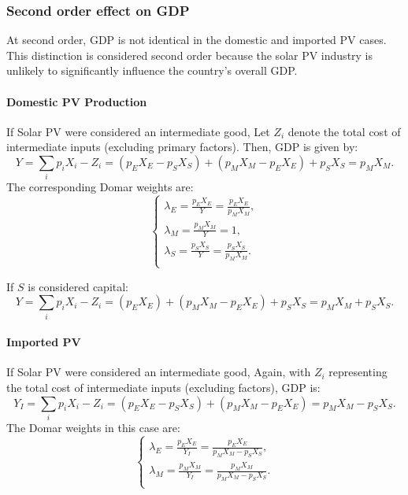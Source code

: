 \documentclass[11pt]{article}
\begin{document}
\subsubsection{Second order effect on GDP}

At second order, GDP is not identical in the domestic and imported PV cases. This distinction is considered second order because the solar PV industry is unlikely to significantly influence the country's overall GDP.

\paragraph{Domestic PV Production}  

If Solar PV were considered an intermediate good,
Let $Z_i$ denote the total cost of intermediate inputs (excluding primary factors). Then, GDP is given by:
\begin{equation}
     Y = \sum_i p_i X_i - Z_i = (p_E X_E - p_S X_S) + (p_M X_M - p_E X_E) + p_S X_S = p_M X_M.
\end{equation}
The corresponding Domar weights are:
\begin{equation}
    \begin{cases}
        \lambda_E = \frac{p_E X_E}{Y} = \frac{p_E X_E}{p_M X_M},\\
        \lambda_M = \frac{p_M X_M}{Y} = 1,\\
        \lambda_S = \frac{p_S X_S}{Y} = \frac{p_S X_S}{p_M X_M}.\\
    \end{cases}
\end{equation}

If $S$ is considered capital: 
\begin{equation}
     Y = \sum_i p_i X_i - Z_i = (p_E X_E) + (p_M X_M - p_E X_E) + p_S X_S = p_M X_M +  p_S X_S.
\end{equation}

\paragraph{Imported PV}  
If Solar PV were considered an intermediate good,
Again, with $Z_i$ representing the total cost of intermediate inputs (excluding factors), GDP is:
\begin{equation}
     Y_I = \sum_i p_i X_i - Z_i = (p_E X_E - p_S X_S) + (p_M X_M - p_E X_E) = p_M X_M - p_S X_S.
\end{equation}
The Domar weights in this case are:
\begin{equation}
    \begin{cases}
        \lambda_E = \frac{p_E X_E}{Y_I} = \frac{p_E X_E}{p_M X_M - p_S X_S},\\
        \lambda_M = \frac{p_M X_M}{Y_I} = \frac{p_M X_M}{p_M X_M - p_S X_S}.\\
    \end{cases}
\end{equation}
\end{document}
